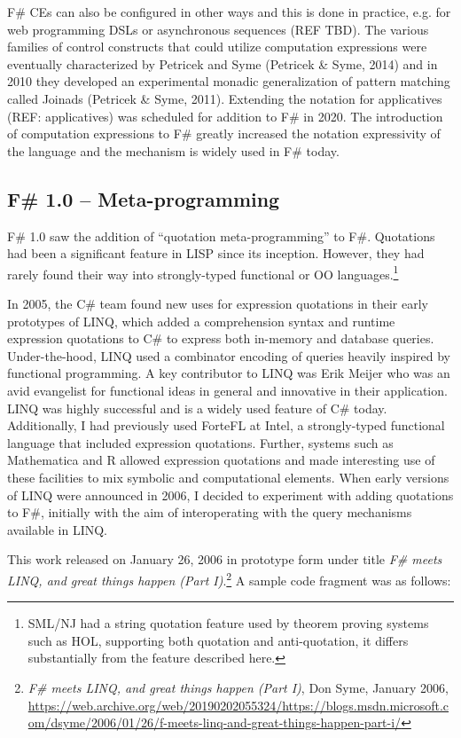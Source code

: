 \documentclass[acmsmall]{acmart}\settopmatter{}
\begin{document}
F\# CEs can also be configured in other ways and this is done in practice, e.g. for web programming DSLs or asynchronous sequences (REF TBD).
The various families of control constructs that could utilize computation expressions were eventually characterized by Petricek
and Syme (Petricek \& Syme, 2014) and in 2010 they developed an experimental monadic generalization of pattern matching called Joinads (Petricek \& Syme, 2011).
Extending the notation for applicatives (REF: applicatives) was scheduled for addition to F\# in 2020. The introduction of computation expressions to F\# greatly increased the notation expressivity of the language
and the mechanism is widely used in F\# today.

\subsection*{F\# 1.0 – Meta-programming}

F\# 1.0 saw the addition of “quotation meta-programming” to F\#.  Quotations had been a significant feature in LISP since its inception. However, they had rarely 
found their way into strongly-typed functional or OO languages.\footnote{SML/NJ had a string quotation feature used by theorem proving systems such as HOL, supporting both quotation and anti-quotation, it differs substantially from the feature described here.}


In 2005, the C\# team found new uses for expression quotations in their early prototypes of LINQ, which added a comprehension syntax and runtime expression quotations to C\# to express both in-memory and database queries. Under-the-hood, LINQ used a combinator encoding of queries heavily inspired by functional programming. A key contributor to LINQ was Erik Meijer who was an avid evangelist for functional ideas in general and innovative in their application. LINQ was highly successful and is a widely used feature of C\# today.  Additionally, I had previously used ForteFL at Intel, a strongly-typed functional language that included expression quotations.  Further, systems such as Mathematica and R allowed expression quotations and made interesting use of these facilities to mix symbolic and computational elements. When early versions of LINQ were announced in 2006, I decided to experiment with adding quotations to F\#, initially with the aim of interoperating with the query mechanisms available in LINQ.  

This work released on January 26, 2006 in prototype form under title \textit{F\# meets LINQ, and great things happen (Part I)}.\footnote{\textit{F\# meets LINQ, and great things happen (Part I)}, Don Syme, January 2006, \url{https://web.archive.org/web/20190202055324/https://blogs.msdn.microsoft.com/dsyme/2006/01/26/f-meets-linq-and-great-things-happen-part-i/}}   A sample code fragment was as follows:
\end{document}
